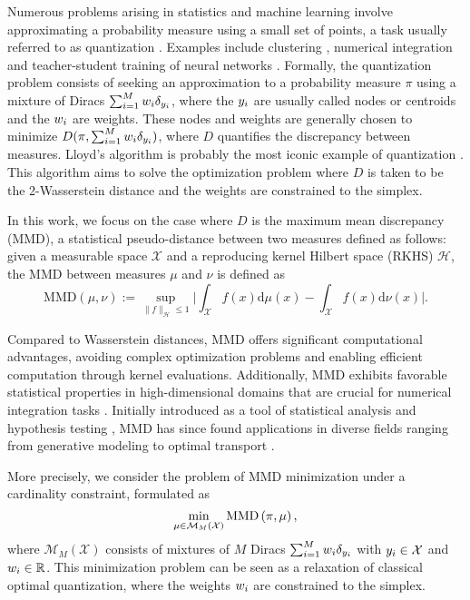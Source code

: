 
Numerous problems arising in statistics and machine learning involve approximating a probability measure using a small set of points, a task usually referred to as quantization \cite{GrLu00}. Examples include clustering \cite{Llo82}, numerical integration \cite{RoCaCa99,Bac17} and teacher-student training of neural networks \cite{ChOyBa19,ArKoSaGr19}. Formally, the quantization problem consists of seeking an approximation to a probability measure $\pi$ using a mixture of Diracs $\sum_{i=1}^M w_{i} \delta_{y_{i}}$, where the $y_{i}$ are usually called nodes or centroids and the $w_{i}$ are weights. These nodes and weights are generally chosen to minimize $D(\pi, \sum_{i=1}^M w_{i} \delta_{y_{i}})$, where $D$ quantifies the discrepancy between measures. Lloyd’s algorithm is probably the most iconic example of quantization \cite{Llo82}. This algorithm aims to solve the optimization problem where $D$ is taken to be the 2-Wasserstein distance and the weights are constrained to the simplex. 



In this work, we focus on the case where $D$ is the maximum mean discrepancy (MMD), a statistical pseudo-distance between two measures defined as follows: given a measurable space $\mathcal{X}$ and a reproducing kernel Hilbert space (RKHS) $\mathcal{H}$, the MMD between measures $\mu$ and $\nu$ is defined as 
\begin{equation*}
\mathrm{MMD}(\mu,\nu) := \sup_{\|f\|_{\mathcal{H}}\leq 1}\Big|\int_{\mathcal{X}} f(x) \mathrm{d} \mu(x) - \int_{\mathcal{X}} f(x) \mathrm{d} \nu(x)\Big|.
\end{equation*}

Compared to Wasserstein distances, MMD offers significant computational advantages, avoiding complex optimization problems and enabling efficient computation through kernel evaluations. Additionally,  MMD exhibits favorable statistical properties in high-dimensional domains that are crucial for numerical integration tasks \cite{MuFuSrSc17,WeBa19}. Initially introduced as a tool of statistical analysis and hypothesis testing \citep{GrFuTeScSm07, GrBoRaScSm12},  MMD has since found applications in diverse fields ranging from generative modeling \citep{DzRoGh15, LiChChYaPo17} to optimal transport \citep{ChNiRi24,PeCu19}.

More precisely, we consider the problem of MMD minimization under a cardinality constraint, formulated as
\begin{equation}\label{eq:constrained_MMD_minimization}
\min_{\mu \in \mathcal{M}_{M}(\mathcal{X}) }\operatorname{MMD}\left(\pi,\mu \right),
\end{equation}
where $\mathcal{M}_{M}(\mathcal{X})$ consists of mixtures of $M$ Diracs $\sum_{i=1}^{M} w_{i} \delta_{y_{i}}$ with $y_{i} \in \mathcal{X}$ and $w_{i} \in \mathbb{R}$. 
This minimization problem can be seen as a relaxation of 
classical optimal quantization, where the weights $w_{i}$ are constrained to the simplex.

